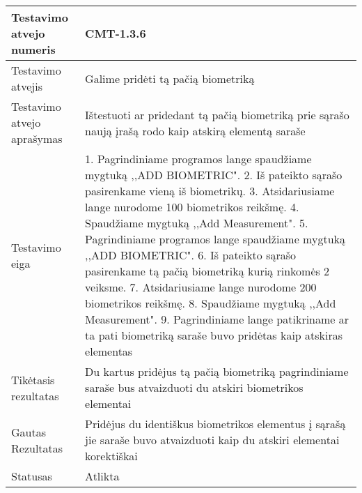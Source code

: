 \documentclass[oneside]{VUMIFPSkursinis}
\begin{document}
\begin{center}
    \begin{tabular}{ |p{5cm}|p{13cm}|}
    \hline
        Testavimo atvejo numeris &  CMT-1.3.6\\ \hline
        Testavimo atvejis & Galime pridėti tą pačią biometriką \\ \hline
        Testavimo atvejo aprašymas & Ištestuoti ar pridedant tą pačią biometriką prie sąrašo naują įrašą rodo kaip atskirą elementą saraše  \\ \hline
        Testavimo eiga &  1. Pagrindiniame programos lange spaudžiame mygtuką ,,ADD BIOMETRIC". 
				2. Iš pateikto sąrašo pasirenkame vieną iš biometrikų. 
				3. Atsidariusiame lange nurodome 100 biometrikos reikšmę.
				4. Spaudžiame mygtuką ,,Add Measurement".
				5. Pagrindiniame programos lange spaudžiame mygtuką ,,ADD BIOMETRIC".
				6. Iš pateikto sąrašo pasirenkame tą pačią biometriką kurią rinkomės 2 veiksme.
				7. Atsidariusiame lange nurodome 200 biometrikos reikšmę.
				8. Spaudžiame mygtuką ,,Add Measurement".
				9. Pagrindiniame lange patikriname ar ta pati biometriką saraše buvo pridėtas kaip atskiras elementas \\ \hline
        Tikėtasis rezultatas &  Du kartus pridėjus tą pačią biometriką pagrindiniame saraše bus atvaizduoti du atskiri biometrikos elementai\\ \hline
        Gautas Rezultatas &  Pridėjus du identiškus biometrikos elementus į sąrašą jie saraše buvo atvaizduoti kaip du atskiri elementai korektiškai\\ \hline
        Statusas & Atlikta \\ \hline
    \hline
    \end{tabular}
\end{center}
\end{document}
